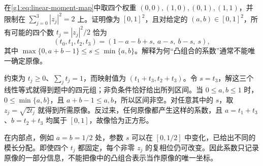 \begin{exercise}\label{g1:ex:moment-square-fiber}
	在\eqref{g1:eq:linear-moment-map}中取四个权重 \((0,0),(1,0),(0,1),(1,1)\)，并限制在 \(\sum_{j=0}^3|z_j|^2=2\) 上。证明像为 \([0,1]^2\)，且对给定的 \((a,b)\in[0,1]^2\)，所有可能的四个数 \(t_j=|z_j|^2/2\) 恰为
	\[
		(t_0,t_1,t_2,t_3)=(1-a-b+s,\ a-s,\ b-s,\ s),
	\]
	其中 \(\max\{0,a+b-1\}\le s\le\min\{a,b\}\)。解释为何“凸组合的系数”通常不能唯一确定原像。
\end{exercise}
\begin{solution}
	约束为 \(t_j\ge0\)、\(\sum_jt_j=1\)，而映射值为 \((t_1+t_3,t_2+t_3)\)。令 \(s=t_3\)，解这三个线性等式就得到题中的四元组；非负条件恰好给出所列区间。当 \(0\le a,b\le1\) 时，\(0\le\min\{a,b\}\)，且 \(a+b-1\le a,b\)，所以区间非空。对任意其中的 \(s\)，取 \(z_j=\sqrt{2t_j}\) 就得到所需原像。反过来，任何原像都产生这样的系数，且 \(a=t_1+t_3\)、\(b=t_2+t_3\) 均属于 \([0,1]\)，故像恰为正方形。

	在内部点，例如 \(a=b=1/2\) 处，参数 \(s\) 可以在 \([0,1/2]\) 中变化，已给出不同的模长分配。即使四个 \(t_j\) 都固定，每个非零 \(z_j\) 的复相位仍可改变。因此系数只记录原像的一部分信息，不能把像中的凸组合表示当作原像的唯一坐标。
\end{solution}
